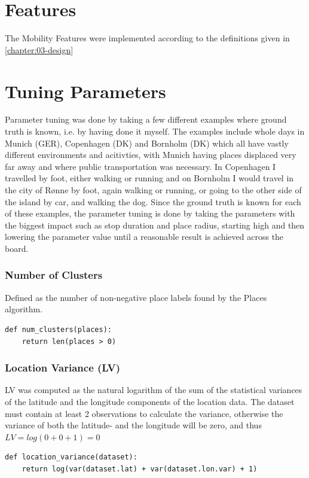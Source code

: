 \section{Features}
The Mobility Features were implemented according to the definitions given in \ref{chapter:03-design}

\section{Tuning Parameters}
Parameter tuning was done by taking a few different examples where ground truth is  known, i.e. by having done it myself. The examples include whole days in Munich (GER), Copenhagen (DK) and Bornholm (DK) which all have vastly different environments and acitivties, with Munich having places displaced very far away and where public transportation was necessary. In Copenhagen I travelled by foot, either walking or running and on Bornholm I would travel in the city of Rønne by foot, again walking or running, or going to the other side of the island by car, and walking the dog. Since the ground truth is known for each of these examples, the parameter tuning is done by taking the parameters with the biggest impact such as stop duration and place radius, starting high and then lowering the parameter value until a reasonable result is achieved across the board.


\subsubsection{Number of Clusters}
Defined as the number of non-negative place labels found by the Places algorithm.

\begin{verbatim}
def num_clusters(places):
    return len(places > 0)
\end{verbatim}

\subsubsection{Location Variance (LV)} 
LV was computed as the natural logarithm of the sum of the statistical variances of the latitude and the longitude components of the location data. The dataset must contain at least 2 observations to calculate the variance, otherwise the variance of both the latitude- and the longitude will be zero, and thus $LV = log(0 + 0 + 1)  = 0$

\begin{verbatim}
def location_variance(dataset):
    return log(var(dataset.lat) + var(dataset.lon.var) + 1)
\end{verbatim}

